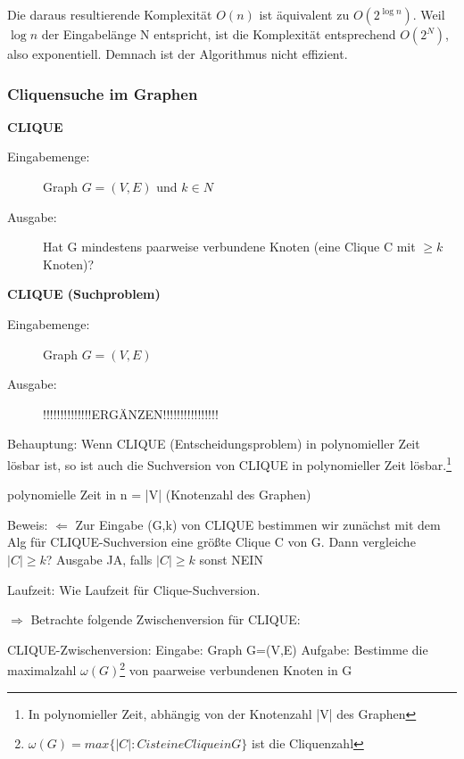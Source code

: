\documentclass{article} %
\begin{document}
Die daraus resultierende Komplexität $O(n)$ ist äquivalent zu $O(2^{\log n})$.
Weil $\log n$ der Eingabelänge N entspricht, ist die Komplexität entsprechend $O(2^N)$, also exponentiell.
Demnach ist der Algorithmus nicht effizient.

\subsubsection{Cliquensuche im Graphen}

\begin{framed}
\textbf{CLIQUE}\\
\begin{description}
	\item[Eingabemenge:] Graph $G= (V,E)$ und $k \in N$
	\item[Ausgabe:] Hat G mindestens paarweise verbundene Knoten (eine Clique C mit $\geq k$ Knoten)?
\end{description} 
\end{framed}

\begin{framed}
\textbf{CLIQUE (Suchproblem)}\\
\begin{description}
	\item[Eingabemenge:] Graph $G= (V,E)$
	\item[Ausgabe:] !!!!!!!!!!!!!!ERGÄNZEN!!!!!!!!!!!!!!!!
\end{description} 
\end{framed}

Behauptung: Wenn CLIQUE (Entscheidungsproblem) in polynomieller Zeit lösbar ist, so ist auch die Suchversion von CLIQUE in polynomieller Zeit lösbar.\footnote{In polynomieller Zeit, abhängig von der Knotenzahl |V| des Graphen}

polynomielle Zeit in n = |V| (Knotenzahl des Graphen)

Beweis: 
$\Leftarrow$ 
Zur Eingabe (G,k) von CLIQUE  bestimmen wir zunächst mit dem Alg für CLIQUE-Suchversion eine größte Clique C von G.
Dann vergleiche $|C| \geq k$? Ausgabe JA, falls $|C| \geq k$ sonst NEIN

Laufzeit: Wie Laufzeit für Clique-Suchversion.

$\Rightarrow$
Betrachte folgende Zwischenversion für CLIQUE:
\begin{framed}
CLIQUE-Zwischenversion:
Eingabe: Graph G=(V,E)
Aufgabe: Bestimme die maximalzahl $\omega (G)$\footnote{$\omega(G) = max \{|C|: C ist eine Clique in G\}$ ist die Cliquenzahl} von paarweise verbundenen Knoten in G
\end{framed}
\end{document}
